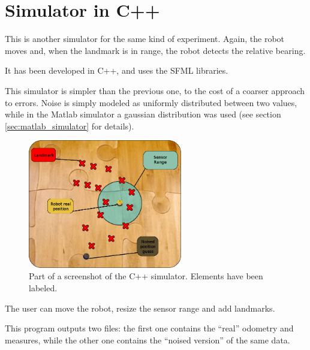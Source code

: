 \section{Simulator in C++}
This is another simulator for the same kind of experiment.
Again, the robot moves and, when the landmark is in range, the robot detects the relative bearing.

It has been developed in C++, and uses the SFML libraries.

This simulator is simpler than the previous one, to the cost of a coarser approach to errors.
Noise is simply modeled as uniformly distributed between two values, while in the Matlab simulator a gaussian distribution was used (see section \ref{sec:matlab_simulator} for details).

\begin{figure}[htbp]
  \centering
    \includegraphics[width=0.6\textwidth]{images/cpp_simulator.png}
  \caption{Part of a screenshot of the C++ simulator. Elements have been labeled.}
  \label{fig:cpp_simulator}
\end{figure}

The user can move the robot, resize the sensor range and add landmarks.

This program outputs two files: the first one contains the ``real'' odometry and measures, while the other one contains the ``noised version'' of the same data.

